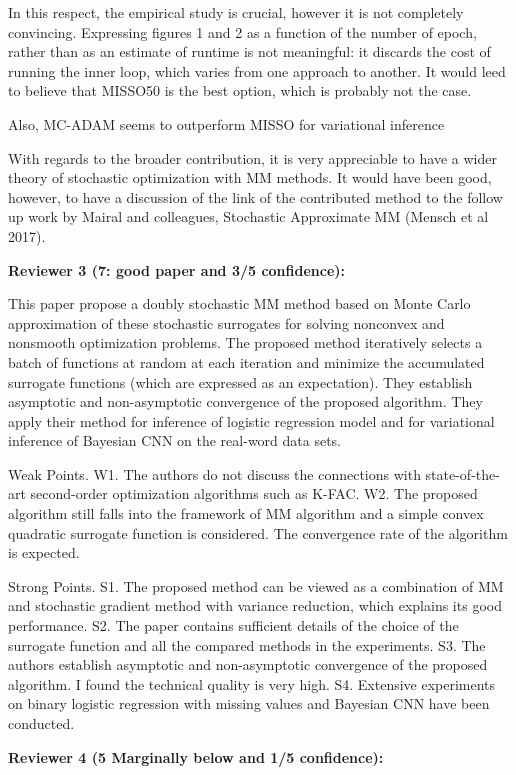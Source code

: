 \documentclass{article}
\begin{document}
In this respect, the empirical study is crucial, however it is not completely convincing. Expressing figures 1 and 2 as a function of the number of epoch, rather than as an estimate of runtime is not meaningful: it discards the cost of running the inner loop, which varies from one approach to another. It would leed to believe that MISSO50 is the best option, which is probably not the case.

Also, MC-ADAM seems to outperform MISSO for variational inference

With regards to the broader contribution, it is very appreciable to have a wider theory of stochastic optimization with MM methods. It would have been good, however, to have a discussion of the link of the contributed method to the follow up work by Mairal and colleagues, Stochastic Approximate MM (Mensch et al 2017).


\textbf{Reviewer 3 (7: good paper and 3/5 confidence):}

This paper propose a doubly stochastic MM method based on Monte Carlo approximation of these stochastic surrogates for solving nonconvex and nonsmooth optimization problems. The proposed method iteratively selects a batch of functions at random at each iteration and minimize the accumulated surrogate functions (which are expressed as an expectation). They establish asymptotic and non-asymptotic convergence of the proposed algorithm. They apply their method for inference of logistic regression model and for variational inference of Bayesian CNN on the real-word data sets.

Weak Points. W1. The authors do not discuss the connections with state-of-the-art second-order optimization algorithms such as K-FAC. W2. The proposed algorithm still falls into the framework of MM algorithm and a simple convex quadratic surrogate function is considered. The convergence rate of the algorithm is expected.

Strong Points. S1. The proposed method can be viewed as a combination of MM and stochastic gradient method with variance reduction, which explains its good performance. S2. The paper contains sufficient details of the choice of the surrogate function and all the compared methods in the experiments. S3. The authors establish asymptotic and non-asymptotic convergence of the proposed algorithm. I found the technical quality is very high. S4. Extensive experiments on binary logistic regression with missing values and Bayesian CNN have been conducted.


\textbf{Reviewer 4 (5 Marginally below and 1/5 confidence):}
\end{document}
